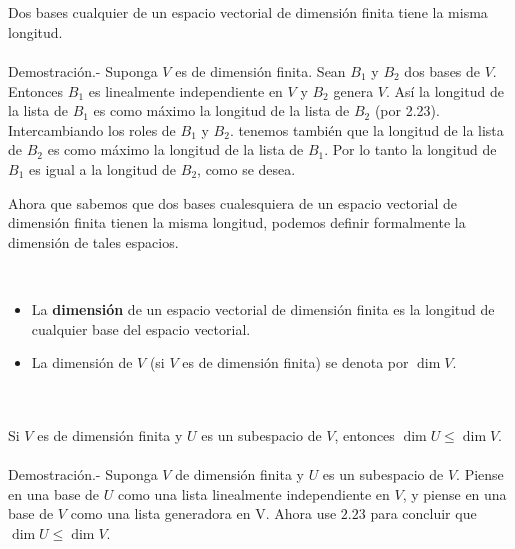 \begin{myteo}\,\\\\
    Dos bases cualquier de un espacio vectorial de dimensión finita  tiene la misma longitud.\\\\
	Demostración.-\; Suponga $V$ es de dimensión finita. Sean $B_1$ y $B_2$ dos bases de $V$. Entonces $B_1$ es linealmente independiente en $V$ y $B_2$ genera $V$. Así la longitud de la lista de $B_1$ es como máximo la longitud de la lista de $B_2$ (por 2.23). Intercambiando los roles de $B_1$ y $B_2$. tenemos también que la longitud de la lista de $B_2$ es como máximo la longitud de la lista de $B_1$. Por lo tanto la longitud de $B_1$ es igual a la longitud de $B_2$, como se desea.
\end{myteo}

Ahora que sabemos que dos bases cualesquiera de un espacio vectorial de dimensión finita tienen la misma longitud, podemos definir formalmente la dimensión de tales espacios.

\begin{mydef}\;\\
    \begin{itemize}
	\item La \textbf{dimensión} de un espacio vectorial de dimensión finita es la longitud de cualquier base del espacio vectorial.
	\item La dimensión de $V$ (si $V$ es de dimensión finita) se denota por $\dim V$.
    \end{itemize}
\end{mydef}

\setcounter{myteo}{37}
\begin{myteo}\, \\\\
    Si $V$ es de dimensión finita y $U$ es un subespacio de $V$, entonces $\dim U\leq \dim V$.\\\\
	Demostración.-\; Suponga $V$ de dimensión finita y $U$ es un subespacio de $V$. Piense en una base de $U$ como una lista linealmente independiente en $V$, y piense en una base de $V$ como una lista generadora en V. Ahora use $2.23$ para concluir que $\dim U\leq \dim V$.
\end{myteo}

